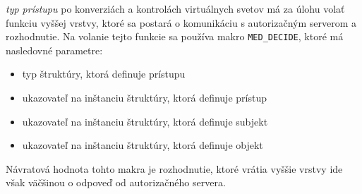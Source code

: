 \textit{typ prístupu} po konverziách a kontrolách virtuálnych svetov má za úlohu volať funkciu vyššej vrstvy, ktoré sa postará o komunikáciu s autorizačným serverom a rozhodnutie. Na volanie tejto funkcie sa používa makro \texttt{MED\_DECIDE}, ktoré má nasledovné parametre:
\begin{itemize}
\item typ štruktúry, ktorá definuje prístupu
\item ukazovateľ na inštanciu štruktúry, ktorá definuje prístup
\item ukazovateľ na inštanciu štruktúry, ktorá definuje subjekt
\item ukazovateľ na inštanciu štruktúry, ktorá definuje objekt
\end{itemize}
Návratová hodnota tohto makra je rozhodnutie, ktoré vrátia vyššie vrstvy ide však väčšinou o odpoveď od autorizačného servera.
